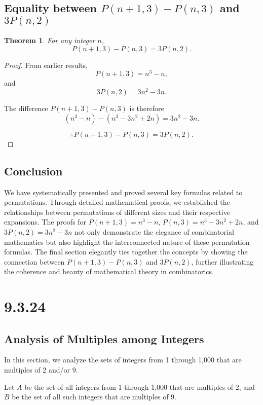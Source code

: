 \documentclass[12pt]{article}
\newtheorem{theorem}{Theorem}
\begin{document}
\subsection{Equality between \( P(n+1,3) - P(n,3) \) and \( 3P(n,2) \)}
\begin{theorem}
For any integer \( n \),
\[ P(n+1,3) - P(n,3) = 3P(n,2). \]
\end{theorem}

\begin{proof}
From earlier results,
\[ P(n+1,3) = n^3 - n, \]
and
\[ 3P(n,2) = 3n^2 - 3n. \]

The difference \( P(n+1,3) - P(n,3) \) is therefore
\[ (n^3 - n) - (n^3 - 3n^2 + 2n) = 3n^2 - 3n. \]

\[ \therefore P(n+1,3) - P(n,3) = 3P(n,2). \]
\end{proof}

\subsection{Conclusion}

We have systematically presented and proved several key formulas related to permutations. Through detailed mathematical proofs, we established the relationships between permutations of different sizes and their respective expansions. The proofs for \( P(n+1,3) = n^3 - n \), \( P(n,3) = n^3 - 3n^2 + 2n \), and \( 3P(n,2) = 3n^2 - 3n \) not only demonstrate the elegance of combinatorial mathematics but also highlight the interconnected nature of these permutation formulas. The final section elegantly ties together the concepts by showing the connection between \( P(n+1,3) - P(n,3) \) and \( 3P(n,2) \), further illustrating the coherence and beauty of mathematical theory in combinatorics. 

\section{9.3.24}

\subsection*{Analysis of Multiples among Integers}

In this section, we analyze the sets of integers from 1 through 1,000 that are multiples of 2 and/or 9.

Let \( A \) be the set of all integers from 1 through 1,000 that are multiples of 2, and \( B \) be the set of all such integers that are multiples of 9.
\end{document}

